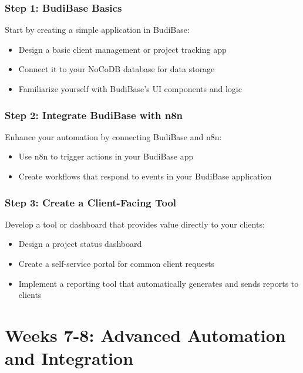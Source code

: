 \subsubsection{Step 1: BudiBase Basics}
Start by creating a simple application in BudiBase:

\begin{itemize}
    \item Design a basic client management or project tracking app
    \item Connect it to your NoCoDB database for data storage
    \item Familiarize yourself with BudiBase's UI components and logic
\end{itemize}


\subsubsection{Step 2: Integrate BudiBase with n8n}
Enhance your automation by connecting BudiBase and n8n:

\begin{itemize}
    \item Use n8n to trigger actions in your BudiBase app
    \item Create workflows that respond to events in your BudiBase application
\end{itemize}

\subsubsection{Step 3: Create a Client-Facing Tool}
Develop a tool or dashboard that provides value directly to your clients:

\begin{itemize}
    \item Design a project status dashboard
    \item Create a self-service portal for common client requests
    \item Implement a reporting tool that automatically generates and sends reports to clients
\end{itemize}



\section{Weeks 7-8: Advanced Automation and Integration}

